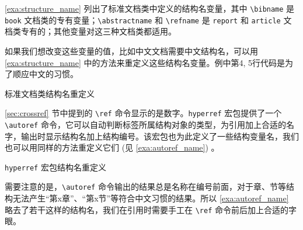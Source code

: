 \autoref{exa:structure_name} 列出了标准文档类中定义的结构名变量，其中 \verb|\bibname| 是 \texttt{book} 文档类的专有变量；\verb|\abstractname| 和 \verb|\refname| 是 \texttt{report} 和 \texttt{article} 文档类专有的；其他变量对这三种文档类都适用。

如果我们想改变这些变量的值，比如中文文档需要中文结构名，可以用 \autoref{exa:structure_name} 中的方法来重定义这些结构名变量。例中第4, 5行代码是为了顺应中文的习惯。

\begin{example}[htbp]
\begin{Code}[]
\renewcommand{\contentsname}{`目录`}
\renewcommand{\listfigurename}{`图目录`}
\renewcommand{\listtablename}{`表目录`}
\renewcommand{\partname}{`第` \thepart `部分`}
\renewcommand{\chaptername}{`第` \thechapter `章`}
\renewcommand{\figurename}{`图`}
\renewcommand{\tablename}{`表`}
\renewcommand{\bibname}{`参考文献`}
\renewcommand{\appendixname}{`附录`}
\renewcommand{\indexname}{`索引`}
\renewcommand{\abstractname}{`摘要`}
\renewcommand{\refname}{`参考文献`}
\end{Code}
\caption{标准文档类结构名重定义}
\label{exa:structure_name}
\end{example}

\ref{sec:crossref} 节中提到的 \verb|\ref| 命令显示的是数字。\texttt{hyperref} 宏包提供了一个 \verb|\autoref| 命令，它可以自动判断标签所属结构对象的类型，为引用加上合适的名字，输出时显示结构名加上结构编号。该宏包也为此定义了一些结构变量名，我们也可以用同样的方法重定义它们 (见 \autoref{exa:autoref_name}) 。

\begin{example}[htbp]
\begin{Code}[]
\renewcommand{\equationautorefname}{`公式`}
\renewcommand{\footnoteautorefname}{`脚注`}
\renewcommand{\itemautorefname}{`项`}
\renewcommand{\figureautorefname}{`图`}
\renewcommand{\tableautorefname}{`表`}
\renewcommand{\appendixautorefname}{`附录`}
\renewcommand{\theoremautorefname}{`定理`}
\end{Code}
\caption{\texttt{hyperref} 宏包结构名重定义}
\label{exa:autoref_name}
\end{example}

需要注意的是，\verb|\autoref| 命令输出的结果总是名称在编号前面，对于章、节等结构无法产生“第x章”、“第x节”等符合中文习惯的结果。所以 \autoref{exa:autoref_name} 略去了若干这样的结构名，我们在引用时需要手工在 \verb|\ref| 命令前后加上合适的字眼。




